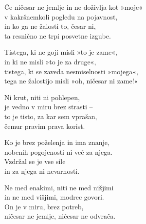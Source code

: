 Če ničesar ne jemlje in ne doživlja kot »moje«\\
v kakršnemkoli pogledu na pojavnost,\\
in ko ga ne žalosti to, česar ni,\\
ta resnično ne trpi posvetne izgube.

Tistega, ki ne goji misli »to je zame«,\\
in ki ne misli »to je za druge«,\\
tistega, ki se zaveda nesmiselnosti »mojega«,\\
tega ne žalostijo misli »oh, ničesar ni zame!«

Ni krut, niti ni pohlepen,\\
je vedno v miru brez strasti --\\
to je tisto, za kar sem vprašan,\\
čemur pravim prava korist.

Ko je brez poželenja in ima znanje,\\
nobenih pogojenosti ni več za njega.\\
Vzdržal se je vse sile\\
in za njega ni nevarnosti.


\clearpage

Ne med enakimi, niti ne med nižjimi\\
in ne med višjimi, modrec govori.\\
On je v miru, brez potreb,\\
ničesar ne jemlje, ničesar ne odvrača.

